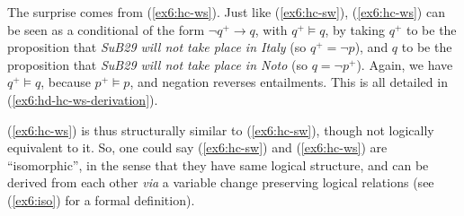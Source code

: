 \begin{exe}
	\label{ex6:hd-hc-sw-derivation}
\end{exe}

The surprise comes from (\ref{ex6:hc-ws}). Just like  (\ref{ex6:hc-sw}),  (\ref{ex6:hc-ws}) can be seen as a conditional of the form $\neg q^+ \rightarrow q$, with $q^+ \vDash q$, by taking $q^+$ to be the proposition that \textit{SuB29 will not take place in Italy} (so $q^+ = \neg p$), and $q$ to be the proposition that \textit{SuB29 will not take place in Noto} (so $q = \neg p^+$). Again, we have $q^+ \vDash q$, because $p^+ \vDash p$, and negation reverses entailments. This is all detailed in (\ref{ex6:hd-hc-ws-derivation}).

\begin{exe}
	\label{ex6:hd-hc-ws-derivation}
\end{exe}

(\ref{ex6:hc-ws}) is thus structurally similar to (\ref{ex6:hc-sw}), though not logically equivalent to it. So, one could say (\ref{ex6:hc-sw}) and (\ref{ex6:hc-ws}) are ``isomorphic'', in the sense that they have same logical structure, and can be derived from each other \textit{via} a variable change preserving logical relations (see (\ref{ex6:iso}) for a formal definition). 
\begin{exe}
	\label{ex6:iso}
\end{exe}



